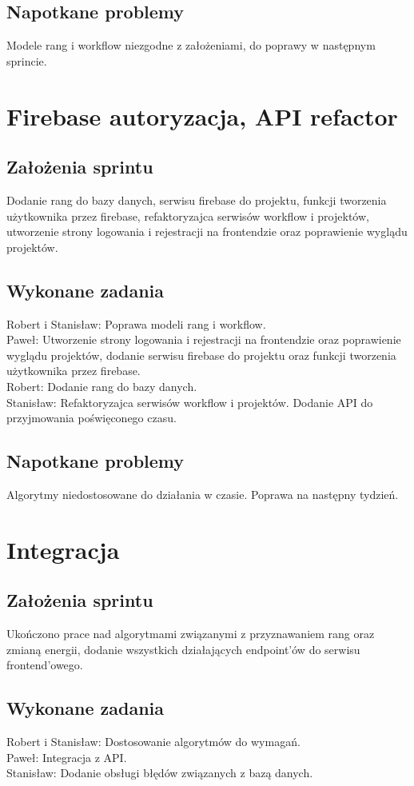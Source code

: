 \documentclass[a4paper,11pt]{report}
\begin{document}
\subsection {Napotkane problemy}
Modele rang i workflow niezgodne z założeniami, do poprawy w następnym sprincie.

\section {Firebase autoryzacja, API refactor}
\subsection {Założenia sprintu}
Dodanie rang do bazy danych, serwisu firebase do projektu, funkcji tworzenia użytkownika przez firebase, refaktoryzajca serwisów workflow i projektów, utworzenie strony logowania i rejestracji na frontendzie oraz poprawienie wyglądu projektów.
\subsection {Wykonane zadania}
Robert i Stanisław: Poprawa modeli rang i workflow.\\
Paweł: Utworzenie strony logowania i rejestracji na frontendzie oraz poprawienie wyglądu projektów, dodanie serwisu firebase do projektu oraz funkcji tworzenia użytkownika przez firebase.\\
Robert: Dodanie rang do bazy danych.\\
Stanisław: Refaktoryzajca serwisów workflow i projektów. Dodanie API do przyjmowania poświęconego czasu.\\
\subsection {Napotkane problemy}
Algorytmy niedostosowane do działania w czasie. Poprawa na następny tydzień.

\section {Integracja}
\subsection {Założenia sprintu}
Ukończono prace nad algorytmami związanymi z przyznawaniem rang oraz zmianą energii, dodanie wszystkich działających endpoint’ów do serwisu frontend'owego.
\subsection {Wykonane zadania}
Robert i Stanisław: Dostosowanie algorytmów do wymagań. \\
Paweł: Integracja z API.\\
Stanisław: Dodanie obsługi błędów związanych z bazą danych. \\
\end{document}
